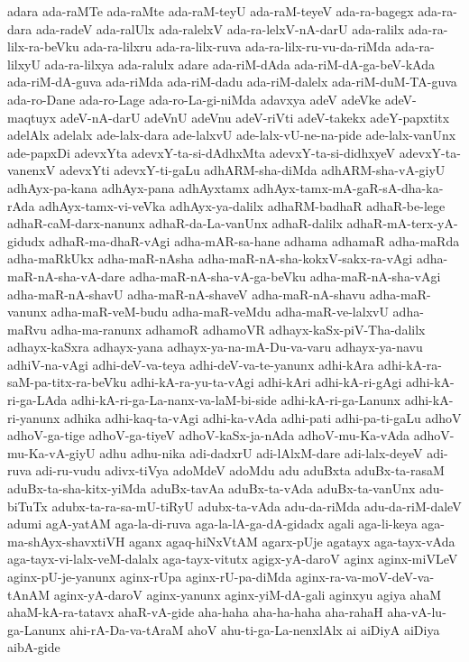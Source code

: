 {adara
ada-raMTe
ada-raMte
ada-raM-teyU
ada-raM-teyeV
ada-ra-bagegx
ada-ra-dara
ada-radeV
ada-ralUlx
ada-ralelxV
ada-ra-lelxV-nA-darU
ada-ralilx
ada-ra-lilx-ra-beVku
ada-ra-lilxru
ada-ra-lilx-ruva
ada-ra-lilx-ru-vu-da-riMda
ada-ra-lilxyU
ada-ra-lilxya
ada-ralulx
adare
ada-riM-dAda
ada-riM-dA-ga-beV-kAda
ada-riM-dA-guva
ada-riMda
ada-riM-dadu
ada-riM-dalelx
ada-riM-duM-TA-guva
ada-ro-Dane
ada-ro-Lage
ada-ro-La-gi-niMda
adavxya
adeV
adeVke
adeV-maqtuyx
adeV-nA-darU
adeVnU
adeVnu
adeV-riVti
adeV-takekx
adeY-papxtitx
adelAlx
adelalx
ade-lalx-dara
ade-lalxvU
ade-lalx-vU-ne-na-pide
ade-lalx-vanUnx
ade-papxDi
adevxYta
adevxY-ta-si-dAdhxMta
adevxY-ta-si-didhxyeV
adevxY-ta-vanenxV
adevxYti
adevxY-ti-gaLu
adhARM-sha-diMda
adhARM-sha-vA-giyU
adhAyx-pa-kana
adhAyx-pana
adhAyxtamx
adhAyx-tamx-mA-gaR-sA-dha-ka-rAda
adhAyx-tamx-vi-veVka
adhAyx-ya-dalilx
adhaRM-badhaR
adhaR-be-lege
adhaR-caM-darx-nanunx
adhaR-da-La-vanUnx
adhaR-dalilx
adhaR-mA-terx-yA-gidudx
adhaR-ma-dhaR-vAgi
adha-mAR-sa-hane
adhama
adhamaR
adha-maRda
adha-maRkUkx
adha-maR-nAsha
adha-maR-nA-sha-kokxV-sakx-ra-vAgi
adha-maR-nA-sha-vA-dare
adha-maR-nA-sha-vA-ga-beVku
adha-maR-nA-sha-vAgi
adha-maR-nA-shavU
adha-maR-nA-shaveV
adha-maR-nA-shavu
adha-maR-vanunx
adha-maR-veM-budu
adha-maR-veMdu
adha-maR-ve-lalxvU
adha-maRvu
adha-ma-ranunx
adhamoR
adhamoVR
adhayx-kaSx-piV-Tha-dalilx
adhayx-kaSxra
adhayx-yana
adhayx-ya-na-mA-Du-va-varu
adhayx-ya-navu
adhiV-na-vAgi
adhi-deV-va-teya
adhi-deV-va-te-yanunx
adhi-kAra
adhi-kA-ra-saM-pa-titx-ra-beVku
adhi-kA-ra-yu-ta-vAgi
adhi-kAri
adhi-kA-ri-gAgi
adhi-kA-ri-ga-LAda
adhi-kA-ri-ga-La-nanx-va-laM-bi-side
adhi-kA-ri-ga-Lanunx
adhi-kA-ri-yanunx
adhika
adhi-kaq-ta-vAgi
adhi-ka-vAda
adhi-pati
adhi-pa-ti-gaLu
adhoV
adhoV-ga-tige
adhoV-ga-tiyeV
adhoV-kaSx-ja-nAda
adhoV-mu-Ka-vAda
adhoV-mu-Ka-vA-giyU
adhu
adhu-nika
adi-dadxrU
adi-lAlxM-dare
adi-lalx-deyeV
adi-ruva
adi-ru-vudu
adivx-tiVya
adoMdeV
adoMdu
adu
aduBxta
aduBx-ta-rasaM
aduBx-ta-sha-kitx-yiMda
aduBx-tavAa
aduBx-ta-vAda
aduBx-ta-vanUnx
adu-biTuTx
adubx-ta-ra-sa-mU-tiRyU
adubx-ta-vAda
adu-da-riMda
adu-da-riM-daleV
adumi
agA-yatAM
aga-la-di-ruva
aga-la-lA-ga-dA-gidadx
agali
aga-li-keya
aga-ma-shAyx-shavxtiVH
aganx
agaq-hiNxVtAM
agarx-pUje
agatayx
aga-tayx-vAda
aga-tayx-vi-lalx-veM-dalalx
aga-tayx-vitutx
agigx-yA-daroV
aginx
aginx-miVLeV
aginx-pU-je-yanunx
aginx-rUpa
aginx-rU-pa-diMda
aginx-ra-va-moV-deV-va-tAnAM
aginx-yA-daroV
aginx-yanunx
aginx-yiM-dA-gali
aginxyu
agiya
ahaM
ahaM-kA-ra-tatavx
ahaR-vA-gide
aha-haha
aha-ha-haha
aha-rahaH
aha-vA-lu-ga-Lanunx
ahi-rA-Da-va-tAraM
ahoV
ahu-ti-ga-La-nenxlAlx
ai
aiDiyA
aiDiya
aibA-gide
}
